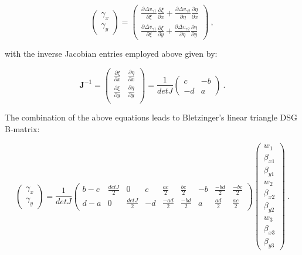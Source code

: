 \begin{equation} 
\begin{pmatrix}
\gamma_x \\
\gamma_y 
\end{pmatrix}
=
\begin{pmatrix}
\frac{\partial \Delta v_{\gamma 1}}{\partial \xi}
\frac{\partial \xi}{\partial x}
+
\frac{\partial \Delta v_{\gamma 2}}{\partial \eta}
\frac{\partial \eta}{\partial x} \\
\frac{\partial \Delta v_{\gamma 1}}{\partial \xi}
\frac{\partial \xi}{\partial y}
+
\frac{\partial \Delta v_{\gamma 2}}{\partial \eta}
\frac{\partial \eta}{\partial y}
\end{pmatrix}
\label{DSG_derivation_13}\ ,
\end{equation}

with the inverse Jacobian entries employed above given by:

\begin{equation} 
\mathbf{J}^{-1} = 
\begin{pmatrix}
\frac{\partial \xi}{\partial x} & \frac{\partial \eta}{\partial x} \\
\frac{\partial \xi}{\partial y} & \frac{\partial \eta}{\partial y} \\
\end{pmatrix}
=
\frac{1}{detJ}
\begin{pmatrix}
c & -b \\
-d & a
\end{pmatrix}
\label{DSG_derivation_14}\ .
\end{equation}

The combination of the above equations leads to Bletzinger's \cite{Ble00} linear triangle DSG B-matrix:

\begin{equation} 
\begin{pmatrix}
\gamma_x \\
\gamma_y 
\end{pmatrix}
=
\frac{1}{detJ}
\begin{pmatrix}
b-c & \frac{detJ}{2} & 0 & c & \frac{ac}{2} & \frac{bc}{2} & -b & \frac{-bd}{2} & \frac{-bc}{2} \\
d-a & 0 & \frac{detJ}{2} & -d & \frac{-ad}{2} & \frac{-bd}{2} & a & \frac{ad}{2} & \frac{ac}{2}
\end{pmatrix}
\begin{pmatrix}
w_1 \\
\beta_{x1} \\
\beta_{y1} \\
w_2 \\
\beta_{x2} \\
\beta_{y2} \\
w_3 \\
\beta_{x3} \\
\beta_{y3} 
\end{pmatrix}
\label{DSG_derivation_15}\ .
\end{equation}

